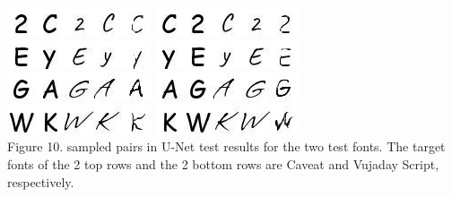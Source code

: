 \documentclass[letterpaper]{article}
\begin{document}
\begin{center}
    \includegraphics[width=.2\textwidth]{./report-figs/1.caveat.1.jpg}
    \includegraphics[width=.2\textwidth]{./report-figs/1.caveat.2.jpg}\\
    \includegraphics[width=.2\textwidth]{./report-figs/1.caveat.3.jpg}
    \includegraphics[width=.2\textwidth]{./report-figs/1.caveat.4.jpg}\\
    \includegraphics[width=.2\textwidth]{./report-figs/1.vujah.1.jpg}
    \includegraphics[width=.2\textwidth]{./report-figs/1.vujah.2.jpg}\\
    \includegraphics[width=.2\textwidth]{./report-figs/1.vujah.3.jpg}
    \includegraphics[width=.2\textwidth]{./report-figs/1.vujah.4.jpg}\\

    Figure 10. sampled pairs in U-Net test results for the two test fonts. The target fonts of the 2 top rows and the 2 bottom rows are Caveat and Vujaday Script, respectively.
\end{center}
\end{document}
